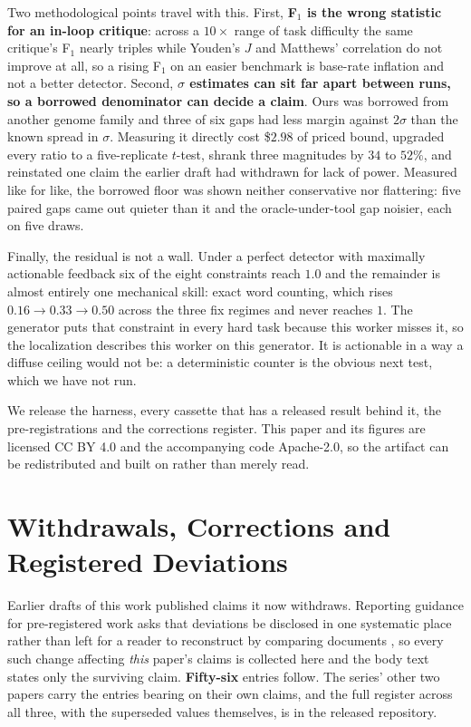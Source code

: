 \documentclass[11pt]{article}
\begin{document}
Two methodological points travel with this. First, \textbf{F$_1$ is the wrong statistic for an
in-loop critique}: across a $10\times$ range of task difficulty the same critique's F$_1$ nearly
triples while Youden's $J$ and Matthews' correlation do not improve at all, so a rising F$_1$ on
an easier benchmark is base-rate inflation and not a better detector. Second,
\textbf{$\sigma$ estimates can sit far apart between runs, so a borrowed denominator can decide
a claim}. Ours
was borrowed from another genome family and three of six gaps had less margin against $2\sigma$
than the known spread in $\sigma$. Measuring it directly cost \$$2.98$ of priced bound, upgraded
every ratio to a five-replicate $t$-test, shrank three magnitudes by $34$ to $52\%$, and
reinstated one claim the earlier draft had withdrawn for lack of power. Measured like for like,
the borrowed floor was shown neither conservative nor flattering: five paired gaps came out
quieter than it and the oracle-under-tool gap noisier, each on five draws.

Finally, the residual is not a wall. Under a perfect detector with maximally actionable feedback
six of the eight constraints reach $1.0$ and the remainder is almost entirely one mechanical skill: exact word
counting, which rises $0.16 \to 0.33 \to 0.50$ across the three fix regimes and never reaches
$1$. The generator puts that constraint in every hard task because this worker misses it, so the
localization describes this worker on this generator. It is actionable in a way a diffuse ceiling
would not be: a deterministic counter is the obvious next test, which we have not run.

We release the harness, every cassette that has a released result behind it, the
pre-registrations and the corrections register. This
paper and its figures are licensed CC BY 4.0 and the accompanying code Apache-2.0, so the
artifact can be redistributed and built on rather than merely read.




\appendix

\section{Withdrawals, Corrections and Registered Deviations}
\label{sec:corrections}

Earlier drafts of this work published claims it now withdraws. Reporting guidance for
pre-registered work asks that deviations be disclosed in
one systematic place rather than left for a reader to reconstruct by comparing documents
\citep{willroth2024bestlaid}, so every such change affecting \emph{this} paper's claims is
collected here and the body text states only the surviving claim. \textbf{Fifty-six} entries follow. The
series' other two papers carry the entries bearing on their own claims, and the full
register across all three, with the superseded values themselves, is in the released repository.
\end{document}
